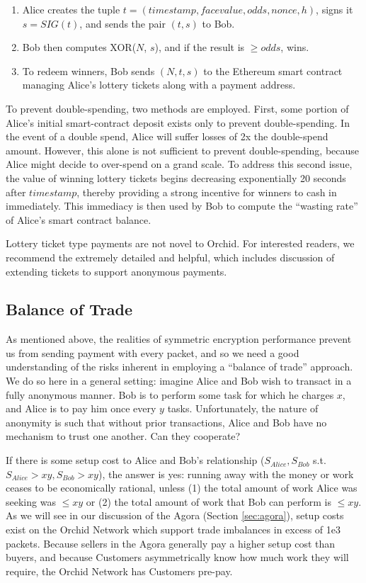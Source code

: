 \documentclass{article}
\newcommand{\orchid}{Orchid}
\newcommand{\Orchid}{\orchid}
\begin{document}
\begin{enumerate}
\item Alice creates the tuple $t = (timestamp, face value, odds, nonce, h)$, signs it $s = SIG(t)$, and sends the pair $(t, s)$ to Bob.
\item Bob then computes XOR($N$, $s$), and if the result is $\geq odds$, wins.
\item To redeem winners, Bob sends $(N, t, s)$ to the Ethereum smart contract managing Alice's lottery tickets along with a payment address.
\end{enumerate}

To prevent double-spending, two methods are employed. First, some portion of Alice's initial smart-contract deposit exists only to prevent double-spending. In the event of a double spend, Alice will suffer losses of 2x the double-spend amount. However, this alone is not sufficient to prevent double-spending, because Alice might decide to over-spend on a grand scale. To address this second issue, the value of winning lottery tickets begins decreasing exponentially 20 seconds after $timestamp$, thereby providing a strong incentive for winners to cash in immediately. This immediacy is then used by Bob to compute the ``wasting rate'' of Alice's smart contract balance.

Lottery ticket type payments are not novel to \Orchid. For interested readers, we recommend the extremely detailed and helpful\cite{DAM}, which includes discussion of extending tickets to support anonymous payments.

\subsection{Balance of Trade}
\label{tokens-bot}

As mentioned above, the realities of symmetric encryption performance prevent us from sending payment with every packet, and so we need a good understanding of the risks inherent in employing a ``balance of trade'' approach. We do so here in a general setting: imagine Alice and Bob wish to transact in a fully anonymous manner. Bob is to perform some task for which he charges $x$, and Alice is to pay him once every $y$ tasks. Unfortunately, the nature of anonymity is such that without prior transactions, Alice and Bob have no mechanism to trust one another. Can they cooperate?

If there is some setup cost to Alice and Bob's relationship ($S_{Alice}, S_{Bob}$ s.t. $S_{Alice} > xy, S_{Bob} > xy$), the answer is yes: running away with the money or work ceases to be economically rational, unless (1) the total amount of work Alice was seeking was $\leq xy$ or (2) the total amount of work that Bob can perform is $\leq xy$. As we will see in our discussion of the Agora (Section \ref{sec:agora}), setup costs exist on the \Orchid{} Network which support trade imbalances in excess of 1e3 packets. Because sellers in the Agora generally pay a higher setup cost than buyers, and because Customers asymmetrically know how much work they will require, the \Orchid{} Network has Customers pre-pay.
\end{document}
